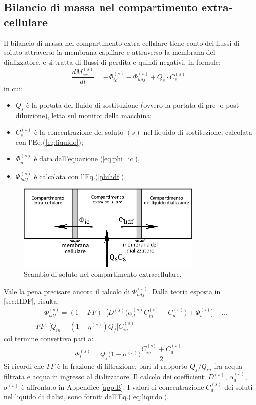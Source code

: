 \subsection{Bilancio di massa nel compartimento extra-cellulare}
Il bilancio di massa nel compartimento extra-cellulare tiene conto dei flussi di soluto attraverso la membrana capillare e attraverso la membrana del dializzatore, e si tratta di flussi di perdita e quindi negativi, in formule:
\begin{equation}
	\frac{dM_{ex}^{(s)}}{dt} = -\Phi_{ic}^{(s)} -\Phi_{hdf}^{(s)} + Q_s\cdot C_s^{(s)}
\end{equation}
in cui:
\begin{itemize}
	\item $Q_s$ è la portata del fluido di sostituzione (ovvero la portata di pre- o post-diluizione), letta sul monitor della macchina;
	\item $C_s^{(s)}$ è la concentrazione del soluto $(s)$ nel liquido di sostituzione, calcolata con l'Eq.(\ref{eq:liquido});
	\item $\Phi_{ic}^{(s)}$ è data dall'equazione (\ref{eq:phi_ic}),
	\item $\Phi_{hdf}^{(s)}$ è calcolata con l'Eq.(\ref{phihdf}).	
\end{itemize}
\begin{figure}[htb]
	\centering
		\includegraphics[width=0.8\textwidth]{immagini/massa_ex.eps}
				\caption{Scambio di soluto nel compartimento extracellulare.}
\end{figure}
Vale la pena precisare ancora il calcolo di $\Phi_{hdf}^{(s)}$. Dalla teoria esposta in \textsection\ref{sec:HDF}, risulta:
\begin{multline}\label{eq:phihdf}
		\qquad \Phi_{hdf}^{(s)} = (1-FF)\cdot \biggl[D^{(s)}\biggl(\alpha_d^{(s)} C_{in}^{(s)} - C_d^{(s)}\biggr)+\Phi_t^{(s)} \biggr] + \ldots \\
		                 + FF\cdot \biggl[Q_{in}-(1-\eta^{(s)})Q_f\biggr] C_{in}^{(s)} \qquad
\end{multline}
col termine convettivo pari a:
\begin{equation*}
	\Phi_t^{(s)} = Q_f \bigl(1-\sigma^{(s)}\bigr) \frac{C_{in}^{(s)} + C_d^{(s)}}{2}
\end{equation*}
Si ricordi che $FF$ è la frazione di filtrazione, pari al rapporto $Q_f/Q_{in}$ fra acqua filtrata e acqua in ingresso al dializzatore. Il calcolo dei coefficienti $D^{(s)}$, $\alpha_d^{(s)}$, $\sigma^{(s)}$ è affrontato in Appendice \ref{app:B}. I valori di concentrazione $C_d^{(s)}$ dei soluti nel liquido di dialisi, sono forniti dall'Eq.(\ref{eq:liquido}).

